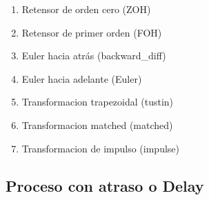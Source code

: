         \begin{enumerate}[leftmargin=\parindent]
            \item Retensor de orden cero  (ZOH)
            \item Retensor de primer orden (FOH)
            \item Euler hacia atrás (backward\_diff)
            \item Euler hacia adelante (Euler)
            \item Transformacion trapezoidal (tustin)
            \item Transformacion matched (matched)
            \item Transformacion de impulso (impulse)
        \end{enumerate}

    \subsection{Proceso con atraso o Delay}
        
        